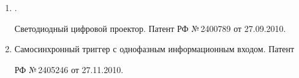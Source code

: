 \begin{enumerate}[1.]
Устройство для формирования и наблюдения изображений. Патент РФ 


№\,2400787 от 27.09.2010.


\item {}.


 Светодиодный цифровой проектор. Патент РФ №\,2400789 от 27.09.2010.


 


  \label{end\stat}


\item {}


Самосинхронный триггер с однофазным информационным входом. Патент 


РФ №\,2405246 от 27.11.2010.


\end{enumerate}


